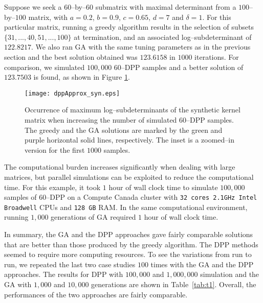 \documentclass[]{interact}
\theoremstyle{plain}%
\theoremstyle{definition}
\theoremstyle{remark}
\begin{document}
Suppose we seek a $60$--by--$60$ submatrix with maximal determinant from a $100$--by--$100$ matrix, with $a=0.2$, $b=0.9$, $c=0.65$, $d=7$ and $\delta=1$. For this particular matrix, running a greedy algorithm results in the selection of subsets $\{31,...,40,51,...,100\}$ at termination, and an associated log--subdeterminant of $122.8217$. We also ran GA with the same tuning parameters as in the previous section and the best solution obtained was $123.6158$ in $1000$ iterations. For comparison, we simulated $100,000$ $60$--DPP samples and a better solution of $123.7503$ is found, as shown in Figure \ref{fig:dppsyn}.

\begin{figure}
    \centering
	\texttt{[image: dppApprox\_syn.eps]}
	\caption{Occurrence of maximum log--subdeterminants of the synthetic kernel matrix when increasing the number of simulated $60$--DPP samples. The greedy and the GA solutions are marked by the green and purple horizontal solid lines, respectively. The inset is a zoomed--in version for the first $1000$ samples.}
    \label{fig:dppsyn}
\end{figure}

The computational burden increases significantly when dealing with large matrices, but parallel simulations can be exploited to reduce the computational time. For this example, it took $1$ hour of wall clock time to simulate $100,000$ samples of $60$--DPP on a Compute Canada cluster with \texttt{32 cores 2.1GHz Intel Broadwell} CPUs and \texttt{128 GB} RAM. In the same computational environment, running $1,000$ generations of GA required $1$ hour of wall clock time. 

In summary, the GA and the DPP approaches gave fairly comparable solutions that are better than those produced by the greedy algorithm. The DPP methods seemed to require more computing resources. To see the variations from run to run, we repeated the last two case studies $100$ times with the GA and the DPP approaches. The results for DPP with $100,000$ and $1,000,000$ simulation and the GA with $1,000$ and $10,000$ generations are shown in Table~\ref{tab:t1}. Overall, the performances of the two approaches are fairly comparable.   
\end{document}
